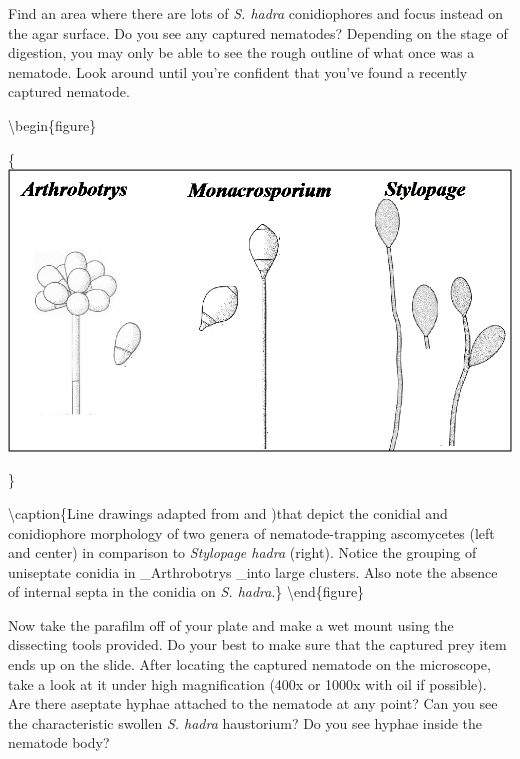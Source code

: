 \documentclass[]{book}
\begin{document}
Find an area where there are lots of \emph{S. hadra} conidiophores and focus instead on the agar surface. Do you see any captured nematodes? Depending on the stage of digestion, you may only be able to see the rough outline of what once was a nematode. Look around until you're confident that you've found a recently captured nematode.

\textbackslash begin\{figure\}

\{\centering \includegraphics[width=13.08in]{img/Ch3_Fig1}

\}

\textbackslash caption\{Line drawings adapted from \citet{Drechsler_1935B} and \citet{Drechsler_1937})that depict the conidial and conidiophore morphology of two genera of nematode-trapping ascomycetes (left and center) in comparison to \emph{Stylopage hadra} (right). Notice the grouping of uniseptate conidia in \_Arthrobotrys \_into large clusters. Also note the absence of internal septa in the conidia on \emph{S. hadra}.\}\label{fig:ch3fig1}
\textbackslash end\{figure\}

Now take the parafilm off of your plate and make a wet mount using the dissecting tools provided. Do your best to make sure that the captured prey item ends up on the slide. After locating the captured nematode on the microscope, take a look at it under high magnification (400x or 1000x with oil if possible). Are there aseptate hyphae attached to the nematode at any point? Can you see the characteristic swollen \emph{S. hadra} haustorium? Do you see hyphae inside the nematode body?
\end{document}
